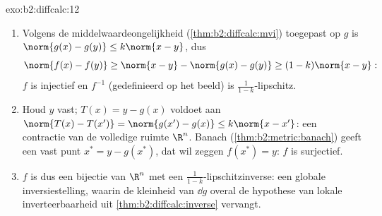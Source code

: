 \begin{solution}{exo:b2:diffcalc:12}
\begin{enumerate}
  \item Volgens de middelwaardeongelijkheid
        (\cref{thm:b2:diffcalc:mvi}) toegepast op $g$ is
        $\norm{g(x) - g(y)} \leq k\norm{x-y}$, dus
        \[
        \norm{f(x) - f(y)} \geq \norm{x - y} - \norm{g(x) -
        g(y)} \geq (1 - k)\norm{x - y} :
        \]
        $f$ is injectief en $f^{-1}$ (gedefinieerd op het beeld)
        is $\frac{1}{1-k}$-lipschitz.
  \item Houd $y$ vast; $T(x) = y - g(x)$ voldoet aan $\norm{T(x) -
        T(x')} = \norm{g(x') - g(x)} \leq k\norm{x - x'}$: een
        contractie van de volledige ruimte $\R^n$. Banach
        (\cref{thm:b2:metric:banach}) geeft een vast punt $x^* = y
        - g(x^*)$, dat wil zeggen $f(x^*) = y$: $f$ is
        surjectief.
  \item $f$ is dus een bijectie van $\R^n$ met een
        $\frac{1}{1-k}$-lipschitzinverse: een globale
        inversiestelling, waarin de kleinheid van $\dd g$ overal de
        hypothese van lokale inverteerbaarheid uit
        \cref{thm:b2:diffcalc:inverse} vervangt.
\end{enumerate}
\end{solution}

